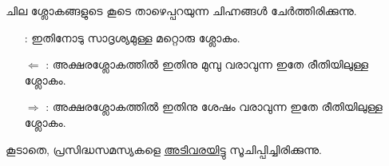 \documentclass{article}
\begin{document}
ചില ശ്ലോകങ്ങളുടെ കൂടെ താഴെപ്പറയുന്ന ചിഹ്നങ്ങൾ ചേർത്തിരിക്കുന്നു.

\begin{enumerate}
\item [\leftpointright]: ഇതിനോടു സാദൃശ്യമുള്ള മറ്റൊരു ശ്ലോകം. 
\item [$\Leftarrow$]: അക്ഷരശ്ലോകത്തിൽ ഇതിനു മുമ്പു വരാവുന്ന ഇതേ രീതിയിലുള്ള
  ശ്ലോകം. 
\item [$\Rightarrow$]: അക്ഷരശ്ലോകത്തിൽ ഇതിനു ശേഷം വരാവുന്ന ഇതേ രീതിയിലുള്ള
  ശ്ലോകം. 
\end{enumerate}

കൂടാതെ, പ്രസിദ്ധസമസ്യകളെ \uline{അടിവരയിട്ടു} സൂചിപ്പിച്ചിരിക്കുന്നു.

\clearpage


\clearpage


\clearpage
\end{document}
